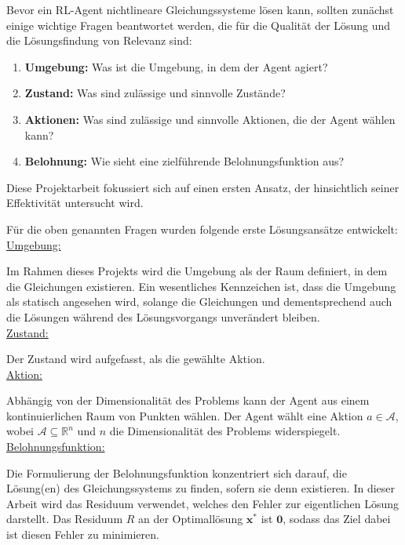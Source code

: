 \documentclass{article}
\theoremstyle{newline}
\begin{document}
\begin{onehalfspace}
Bevor ein RL-Agent nichtlineare Gleichungssysteme lösen kann, sollten zunächst einige wichtige Fragen beantwortet werden, die für die Qualität der Lösung und die Lösungsfindung von Relevanz sind:

\begin{enumerate}
	\item \textbf{Umgebung:} Was ist die Umgebung, in dem der Agent agiert?
	\item \textbf{Zustand:} Was sind zulässige und sinnvolle Zustände?
	\item \textbf{Aktionen:} Was sind zulässige und sinnvolle Aktionen, die der Agent wählen kann?
	\item \textbf{Belohnung:} Wie sieht eine zielführende Belohnungsfunktion aus?
\end{enumerate}

Diese Projektarbeit fokussiert sich auf einen ersten Ansatz, der hinsichtlich seiner Effektivität untersucht wird.

Für die oben genannten Fragen wurden folgende erste Lösungsansätze entwickelt:
\\

\underline{Umgebung:}
\smallskip

Im Rahmen dieses Projekts wird die Umgebung als der Raum definiert, in dem die Gleichungen existieren. Ein wesentliches Kennzeichen ist, dass die Umgebung als statisch angesehen wird, solange die Gleichungen und dementsprechend auch die Lösungen während des Lösungsvorgangs unverändert bleiben.
\\

\underline{Zustand:}
\smallskip

Der Zustand wird aufgefasst, als die gewählte Aktion.
\\

\underline{Aktion:}
\smallskip

Abhängig von der Dimensionalität des Problems kann der Agent aus einem kontinuierlichen Raum von Punkten wählen. Der Agent wählt eine Aktion $a \in \mathcal{A}$, wobei $\mathcal{A} \subseteq \mathbb{R}^{n}$ und $n$ die Dimensionalität des Problems widerspiegelt.
\\
 
\underline{Belohnungsfunktion:}
\smallskip

Die Formulierung der Belohnungsfunktion konzentriert sich darauf, die Lösung(en) des Gleichungssystems zu finden, sofern sie denn existieren. In dieser Arbeit wird das Residuum verwendet, welches den Fehler zur eigentlichen Lösung darstellt. Das Residuum $R$ an der Optimallösung $\mathbf{x}^{\ast}$ ist $\mathbf{0}$, sodass das Ziel dabei ist diesen Fehler zu minimieren. 


\end{onehalfspace}
\end{document}

